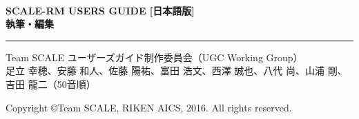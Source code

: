 \newpage
\thispagestyle{empty}

　\\

\vspace{10mm}
{\large{\bf SCALE-RM USERS GUIDE [日本語版]}}\\


\vspace{10mm}
{\large{\bf 執筆・編集}}\\
\hrule width 90mm
\begin{tabbing} 
Team SCALE ユーザーズガイド制作委員会（UGC Working Group）\\
足立 幸穂、安藤 和人、佐藤 陽祐、富田 浩文、西澤 誠也、八代 尚、山浦 剛、吉田 龍二（50音順）\\
\end{tabbing} 


\vspace{110mm}
\begin{flushright}

\vspace{10mm}
Copyright \copyright Team SCALE, RIKEN AICS, 2016. All rights reserved.
\end{flushright}

